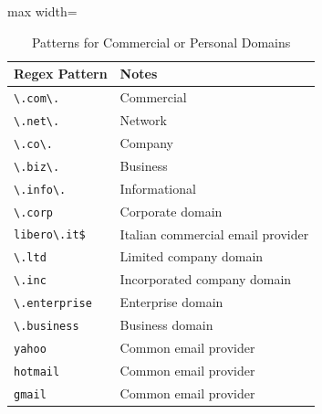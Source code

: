\documentclass[12pt, letterpaper]{article}
\begin{document}
\begin{table}[!htbp]
\centering
\scriptsize
\setlength\tabcolsep{6 pt}
\caption{Patterns for Commercial or Personal Domains}
\label{tab:regex_commercial_personal_domains}
\begin{adjustbox}{max width=\linewidth}
\begin{tabular}{@{\hspace{0\tabcolsep}}ll@{\hspace{0\tabcolsep}}}
\toprule
\textbf{Regex Pattern} & \textbf{Notes} \\
\midrule
\verb|\.com\.| & Commercial \\
\verb|\.net\.| & Network \\
\verb|\.co\.| & Company \\
\verb|\.biz\.| & Business \\
\verb|\.info\.| & Informational \\
\verb|\.corp| & Corporate domain \\
\verb|libero\.it$| & Italian commercial email provider \\
\verb|\.ltd| & Limited company domain \\
\verb|\.inc| & Incorporated company domain \\
\verb|\.enterprise| & Enterprise domain \\
\verb|\.business| & Business domain \\
\verb|yahoo| & Common email provider \\
\verb|hotmail| & Common email provider \\
\verb|gmail| & Common email provider \\
\bottomrule
\end{tabular}
\end{adjustbox}
\end{table}
\end{document}
